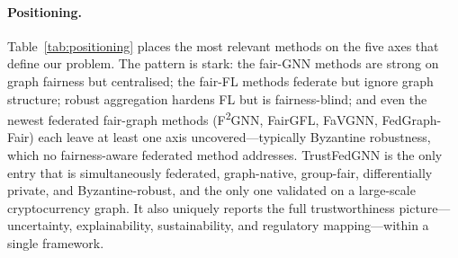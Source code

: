 \documentclass[pdflatex,sn-mathphys-num]{sn-jnl}
\theoremstyle{thmstyleone}%
\theoremstyle{thmstyletwo}%
\theoremstyle{thmstylethree}%
\begin{document}
\paragraph{Positioning.}
Table~\ref{tab:positioning} places the most relevant methods on the five axes
that define our problem. The pattern is stark: the fair-GNN methods are strong
on graph fairness but centralised; the fair-FL methods federate but ignore graph
structure; robust aggregation hardens FL but is fairness-blind; and even the
newest federated fair-graph methods (F\textsuperscript{2}GNN, FairGFL,
FaVGNN, FedGraph-Fair) each leave at least one axis uncovered---typically
Byzantine robustness, which no fairness-aware federated method addresses.
TrustFedGNN is the only entry that is simultaneously federated, graph-native,
group-fair, differentially private, and Byzantine-robust, and the only one
validated on a large-scale cryptocurrency graph. It also uniquely reports the
full trustworthiness picture---uncertainty, explainability, sustainability, and
regulatory mapping---within a single framework.
\end{document}
